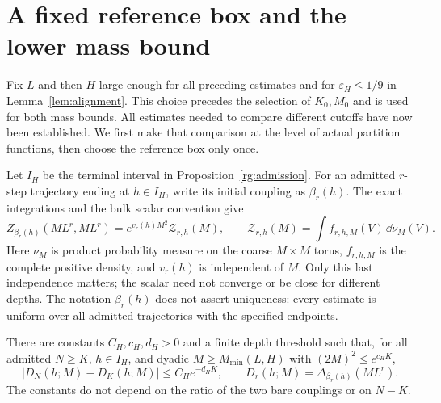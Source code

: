 \section{A fixed reference box and the lower mass bound}
\label{sec:assembly}

Fix $L$ and then $H$ large enough for all preceding estimates and
for $\varepsilon_H\le1/9$ in Lemma~\ref{lem:alignment}. This choice
precedes the selection of $K_0,M_0$ and is used for both mass bounds.
All estimates needed to compare different cutoffs have now been
established. We first make that comparison at the level of actual
partition functions, then choose the reference box only once.

Let $I_H$ be the terminal interval in Proposition~\ref{rg:admission}.
For an admitted $r$-step trajectory ending at $h\in I_H$, write its
initial coupling as $\beta_r(h)$. The exact integrations and the bulk
scalar convention give
\begin{equation}
\label{eq:blocked-partition}
 Z_{\beta_r(h)}(ML^r,ML^r)
   =e^{v_r(h)M^2}\mathcal Z_{r,h}(M),\qquad
 \mathcal Z_{r,h}(M)=\int f_{r,h,M}(V)\,\dd\nu_M(V).
\end{equation}
Here $\nu_M$ is product probability measure on the coarse $M\times M$
torus, $f_{r,h,M}$ is the complete positive density, and $v_r(h)$ is
independent of $M$. Only this last independence matters; the scalar
need not converge or be close for different depths.
The notation $\beta_r(h)$ does not assert uniqueness: every estimate
is uniform over all admitted trajectories with the specified endpoints.

\begin{proposition}
\label{prop:cutoff}
There are constants $C_H,c_H,d_H>0$ and a finite depth threshold such
that, for all admitted $N\ge K$, $h\in I_H$, and dyadic
$M\ge M_{\min}(L,H)$ with $(2M)^2\le e^{c_HK}$,
\begin{equation}
\label{eq:cutoff-comparison}
 |D_N(h;M)-D_K(h;M)|\le C_He^{-d_HK},\qquad
 D_r(h;M)=\Delta_{\beta_r(h)}(ML^r).
\end{equation}
The constants do not depend on the ratio of the two bare couplings or
on $N-K$.
\end{proposition}

